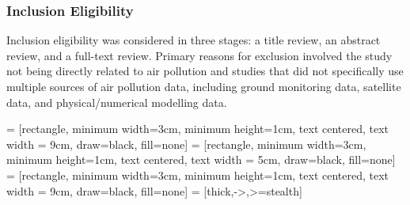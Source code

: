 \subsubsection{Inclusion Eligibility} 
Inclusion eligibility was considered in three stages: a title review, an abstract review, and a full-text review. Primary reasons for exclusion involved the study not being directly related to air pollution and studies that did not specifically use multiple sources of air pollution data, including ground monitoring data, satellite data, and physical/numerical modelling data.

 = [rectangle, minimum width=3cm, minimum height=1cm, text centered, text width = 9cm, draw=black, fill=none]
 = [rectangle, minimum width=3cm, minimum height=1cm, text centered, text width = 5cm, draw=black, fill=none]
 = [rectangle, minimum width=3cm, minimum height=1cm, text centered, text width = 9cm, draw=black, fill=none]
 = [thick,->,>=stealth]



